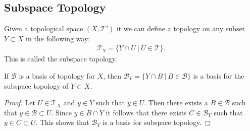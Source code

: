 \subsection{Subspace Topology}
\begin{definition}
  Given a topological space $(X, \mathscr{T}')$ it we can define a topology on any subset $Y\subset X$ in the following way:
  \begin{align*}
    \mathscr{T}_Y = \{Y\cap U\ |\ U\in \mathscr{T}\}.
  \end{align*}
  This is called the subspace topology.
\end{definition}
\begin{theorem}
  If $ \mathscr{B}$ is a basis of topology for $X$, then $ \mathscr{B}_Y = \{Y\cap B\ |\ B\in \mathscr{B}\}$ is a basis for the subspace topology of $Y\subset X$.
\end{theorem}
\begin{proof}
  Let $U \in \mathscr{T}_X$ and $y\in Y$ such that $y\in U$. Then there exists a $B\in \mathscr{B}$ such that $y\in \mathscr{B} \subset U$. Since $y\in B\cap Y$ it follows that there exists $C\in \mathscr{B}_Y$ such that $y\in C \subset U$. This shows that $ \mathscr{B}_Y$ is a basis for subspace topology.
\end{proof}

